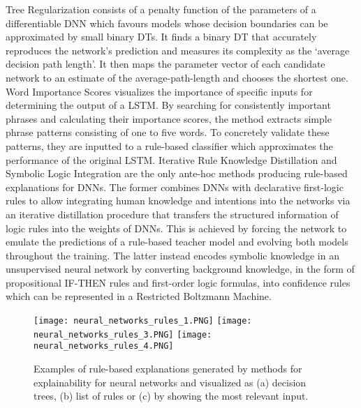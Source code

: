 \documentclass[final,1p,times]{elsarticle}
\begin{document}
Tree Regularization \cite{wu2018beyond} consists of a penalty function of the parameters of a differentiable DNN which favours models whose decision boundaries can be approximated by small binary DTs. It finds a binary DT that accurately reproduces the network's prediction and measures its complexity as the `average decision path length'. It then maps the parameter vector of each candidate network to an estimate of the average-path-length and chooses the shortest one.
Word Importance Scores \cite{murdoch2017automatic} visualizes the importance of specific inputs for determining the output of a LSTM. By searching for consistently important phrases and calculating their importance scores, the method extracts simple phrase patterns consisting of one to five words. To concretely validate these patterns, they are inputted to a rule-based classifier which approximates the performance of the original LSTM.
Iterative Rule Knowledge Distillation \cite{hu2016harnessing} and Symbolic Logic Integration \cite{tran2017unsupervised} are the only ante-hoc methods producing rule-based explanations for DNNs. The former combines DNNs with declarative first-logic rules to allow integrating human knowledge and intentions into the networks via an iterative distillation procedure that transfers the structured information of logic rules into the weights of DNNs. This is achieved by forcing the network to emulate the predictions of a rule-based teacher model and evolving both models throughout the training.
The latter instead encodes symbolic knowledge in an unsupervised neural network by converting background knowledge, in the form of propositional IF-THEN rules and first-order logic formulas, into confidence rules which can be represented in a Restricted Boltzmann Machine.

\begin{figure}[!ht]
\begin{minipage}{\textwidth}
\centering
    {\texttt{[image: neural\_networks\_rules\_1.PNG]}}
    {\texttt{[image: neural\_networks\_rules\_3.PNG]}}
    {\texttt{[image: neural\_networks\_rules\_4.PNG]}}
  \caption{Examples of rule-based explanations generated by methods for explainability for neural networks and visualized as (a) decision trees, (b) list of rules or (c) by showing the most relevant input.}
  \label{fig:neural_networks_rules}
\end{minipage}
\end{figure}
\end{document}
